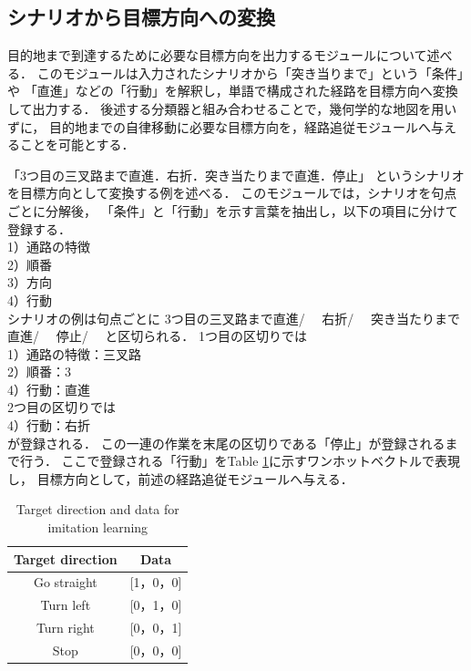 \documentclass{sice-si}
\begin{document}
\subsection{シナリオから目標方向への変換}
目的地まで到達するために必要な目標方向を出力するモジュールについて述べる．
このモジュールは入力されたシナリオから「突き当りまで」という「条件」や
「直進」などの「行動」を解釈し，単語で構成された経路を目標方向へ変換して出力する．
後述する分類器と組み合わせることで，幾何学的な地図を用いずに，
目的地までの自律移動に必要な目標方向を，経路追従モジュールへ与えることを可能とする．
\par
「3つ目の三叉路まで直進．右折．突き当たりまで直進．停止」
というシナリオを目標方向として変換する例を述べる．
このモジュールでは，シナリオを句点ごとに分解後，
「条件」と「行動」を示す言葉を抽出し，以下の項目に分けて登録する．\\
1）通路の特徴\\
2）順番\\
3）方向\\
4）行動\\
シナリオの例は句点ごとに
3つ目の三叉路まで直進/　
右折/　
突き当たりまで直進/　
停止/　
と区切られる．
1つ目の区切りでは\\
1）通路の特徴：三叉路\\
2）順番：3\\
4）行動：直進\\
2つ目の区切りでは\\
4）行動：右折\\
が登録される．
この一連の作業を末尾の区切りである「停止」が登録されるまで行う．
ここで登録される「行動」をTable \ref{tab:target}に示すワンホットベクトルで表現し，
目標方向として，前述の経路追従モジュールへ与える．

\begin{table}[]
    \centering
    \caption{Target direction and data for imitation learning}\label{tab:target}
    \begin{tabular}{|c|c|}
    \hline
    Target direction & Data        \\
    \hline
    Go straight   & {[}1，0，0{]} \\
    Turn left   & {[}0，1，0{]} \\
    Turn right   & {[}0，0，1{]} \\
    Stop   & {[}0，0，0{]}\\
    \hline
    \end{tabular}
    \end{table}
\end{document}
